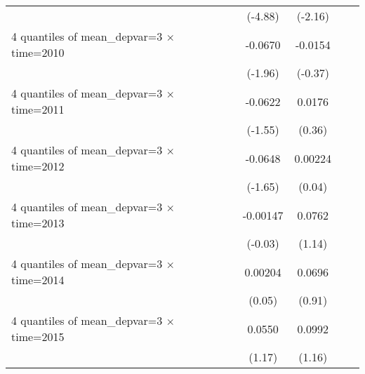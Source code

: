 \begin{table}[htbp]
\begin{tabular}{l*{6}{c}}
                    &                     &                     &     (-4.88)         &     (-2.16)         &                     &                     \\
[1em]
4 quantiles of mean\_depvar=3 $\times$ time=2010&                     &                     &     -0.0670\sym{*}  &     -0.0154         &                     &                     \\
                    &                     &                     &     (-1.96)         &     (-0.37)         &                     &                     \\
[1em]
4 quantiles of mean\_depvar=3 $\times$ time=2011&                     &                     &     -0.0622         &      0.0176         &                     &                     \\
                    &                     &                     &     (-1.55)         &      (0.36)         &                     &                     \\
[1em]
4 quantiles of mean\_depvar=3 $\times$ time=2012&                     &                     &     -0.0648         &     0.00224         &                     &                     \\
                    &                     &                     &     (-1.65)         &      (0.04)         &                     &                     \\
[1em]
4 quantiles of mean\_depvar=3 $\times$ time=2013&                     &                     &    -0.00147         &      0.0762         &                     &                     \\
                    &                     &                     &     (-0.03)         &      (1.14)         &                     &                     \\
[1em]
4 quantiles of mean\_depvar=3 $\times$ time=2014&                     &                     &     0.00204         &      0.0696         &                     &                     \\
                    &                     &                     &      (0.05)         &      (0.91)         &                     &                     \\
[1em]
4 quantiles of mean\_depvar=3 $\times$ time=2015&                     &                     &      0.0550         &      0.0992         &                     &                     \\
                    &                     &                     &      (1.17)         &      (1.16)         &                     &                     \\

\end{tabular}
\end{table}
